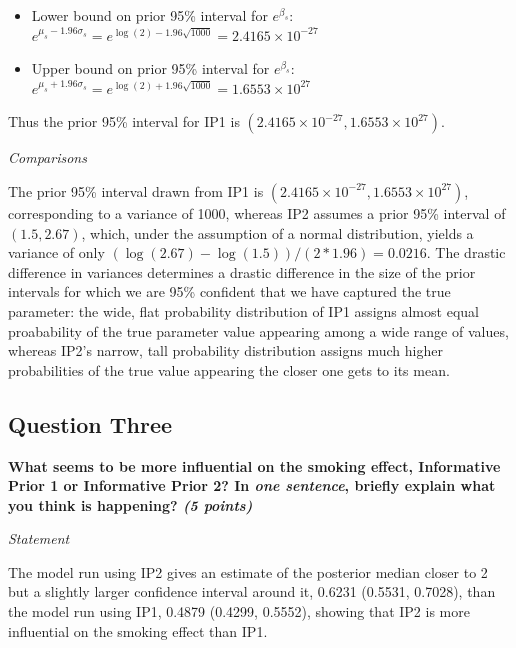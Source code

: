 \documentclass[
  11pt,
]{article}
\begin{document}
\begin{itemize}
\setlength\itemsep{0em}
\item Lower bound on prior 95\% interval for $e^{\beta_s}$: $e^{\mu_s - 1.96\sigma_s} = e^{\log(2) - 1.96\sqrt{1000}} = \ensuremath{2.4165\times 10^{-27}}$
\item Upper bound on prior 95\% interval for $e^{\beta_s}$: $e^{\mu_s + 1.96\sigma_s} = e^{\log(2) + 1.96\sqrt{1000}} = \ensuremath{1.6553\times 10^{27}}$
\end{itemize}

Thus the prior 95\% interval for IP1 is
\((\ensuremath{2.4165\times 10^{-27}}, \ensuremath{1.6553\times 10^{27}})\).

\textit{Comparisons}

The prior 95\% interval drawn from IP1 is
\((\ensuremath{2.4165\times 10^{-27}}, \ensuremath{1.6553\times 10^{27}})\),
corresponding to a variance of 1000, whereas IP2 assumes a prior 95\%
interval of \((1.5, 2.67)\), which, under the assumption of a normal
distribution, yields a variance of only
\((\log(2.67)-\log(1.5))/(2*1.96) = 0.0216\). The drastic difference in
variances determines a drastic difference in the size of the prior
intervals for which we are 95\% confident that we have captured the true
parameter: the wide, flat probability distribution of IP1 assigns almost
equal proabability of the true parameter value appearing among a wide
range of values, whereas IP2's narrow, tall probability distribution
assigns much higher probabilities of the true value appearing the closer
one gets to its mean.

\pagebreak

\hypertarget{question-three}{%
\subsection{Question Three}\label{question-three}}

\textbf{What seems to be more influential on the smoking effect, Informative Prior 1 or Informative Prior 2? In \textit{one sentence}, briefly explain what you think is happening? \textit{(5 points)}}

\textit{Statement}

The model run using IP2 gives an estimate of the posterior median closer
to 2 but a slightly larger confidence interval around it, 0.6231
(0.5531, 0.7028), than the model run using IP1, 0.4879 (0.4299, 0.5552),
showing that IP2 is more influential on the smoking effect than IP1.
\end{document}
